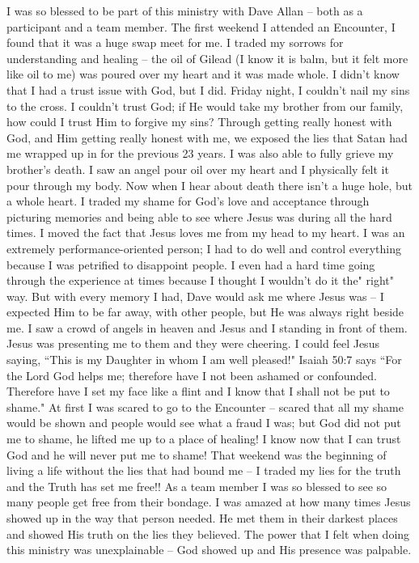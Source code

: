 \documentclass[oneside]{book}
\begin{document}
I was so blessed to be part of this ministry with Dave Allan – both as a participant and a team member.
The first weekend I attended an Encounter, I found that it was a huge swap meet for me. I traded my sorrows for understanding and healing – the oil of Gilead (I know it is balm, but it felt more like oil to me) was poured over my heart and it was made whole. I didn't know that I had a trust issue with God, but I did. Friday night, I couldn't nail my sins to the cross. I couldn't trust God; if He would take my brother from our family, how could I trust Him to forgive my sins? Through getting really honest with God, and Him getting really honest with me, we exposed the lies that Satan had me wrapped up in for the previous 23 years. I was also able to fully grieve my brother's death. I saw an angel pour oil over my heart and I physically felt it pour through my body. Now when I hear about death there isn't a huge hole, but a whole heart.
I traded my shame for God's love and acceptance through picturing memories and being able to see where Jesus was during all the hard times. I moved the fact that Jesus loves me from my head to my heart.
I was an extremely performance-oriented person; I had to do well and control everything because I was petrified to disappoint people. I even had a hard time going through the experience at times because I thought I wouldn't do it the" right" way. But with every memory I had, Dave would ask me where Jesus was – I expected Him to be far away, with other people, but He was always right beside me. I saw a crowd of angels in heaven and Jesus and I standing in front of them. Jesus was presenting me to them and they were cheering. I could feel Jesus saying, ``This is my Daughter in whom I am well pleased!"
Isaiah 50:7 says ``For the Lord God helps me; therefore have I not been ashamed or confounded. Therefore have I set my face like a flint and I know that I shall not be put to shame." At first I was scared to go to the Encounter – scared that all my shame would be shown and people would see what a fraud I was; but God did not put me to shame, he lifted me up to a place of healing! I know now that I can trust God and he will never put me to shame!
That weekend was the beginning of living a life without the lies that had bound me – I traded my lies for the truth and the Truth has set me free!!
As a team member I was so blessed to see so many people get free from their bondage. I was amazed at how many times Jesus showed up in the way that person needed. He met them in their darkest places and showed His truth on the lies they believed. The power that I felt when doing this ministry was unexplainable – God showed up and His presence was palpable.
\end{document}
